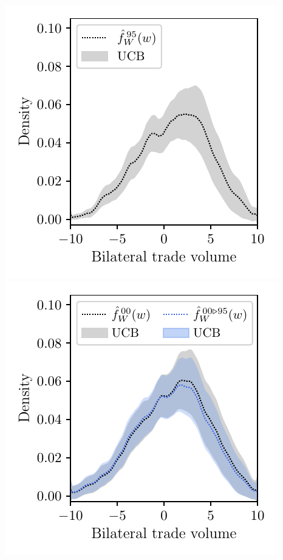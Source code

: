 \documentclass{article}
\begin{document}
\includegraphics[scale=0.5]{graphics/trade_plot_parametric_1995.pdf}
\includegraphics[scale=0.5]{graphics/trade_plot_parametric_1995_2000.pdf}
\end{document}
